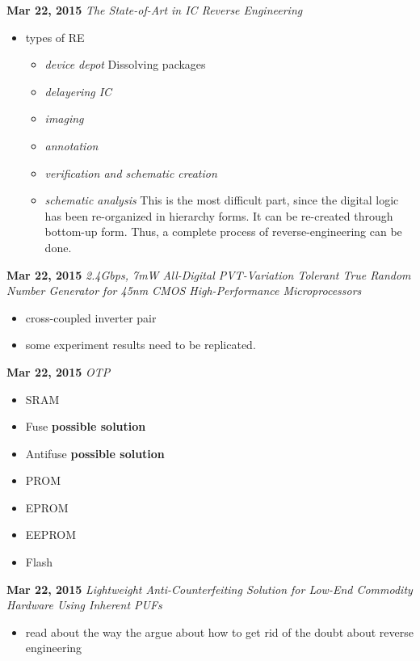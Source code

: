 \documentclass[]{article}
\begin{document}
\noindent \textbf{Mar 22, 2015}
\textit{The State-of-Art in IC Reverse Engineering}
\indent     \begin{itemize}
                \item types of RE
                \begin{itemize}
                    \item \textit{device depot} Dissolving packages
                    \item \textit{delayering IC}
                    \item \textit{imaging}
                    \item \textit{annotation}
                    \item \textit{verification and schematic creation}
                    \item \textit{schematic analysis} This is the most difficult
                    part, since the digital logic has been re-organized in
                    hierarchy forms. It can be re-created through bottom-up
                    form. Thus, a complete process of reverse-engineering can be
                    done.
                \end{itemize} 
            \end{itemize}    

\noindent \textbf{Mar 22, 2015}
\textit{2.4Gbps, 7mW All-Digital PVT-Variation Tolerant True Random Number
Generator for 45nm CMOS High-Performance Microprocessors}
\indent     \begin{itemize}
            \item cross-coupled inverter pair
            \item some experiment results need to be replicated.
            \end{itemize}

\noindent \textbf{Mar 22, 2015}
\textit{OTP}
\indent     \begin{itemize}
            \item SRAM
            \item Fuse \textbf{possible solution}
            \item Antifuse \textbf{possible solution}
            \item PROM
            \item EPROM
            \item EEPROM
            \item Flash
            \end{itemize}

\noindent \textbf{Mar 22, 2015}
\textit{Lightweight Anti-Counterfeiting Solution for Low-End Commodity Hardware
Using Inherent PUFs}
\indent     \begin{itemize}
            \item read about the way the argue about how to get rid of the doubt
            about reverse engineering
            \end{itemize}
\end{document}
